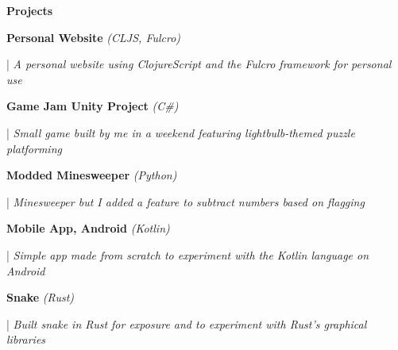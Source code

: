 \documentclass[letterpaper,11pt]{article}
\begin{document}
\textbf{\large Projects}


\begin{minipage}[t]{0.28\textwidth}
    \raggedright
    \textbf{ Personal Website }\textit{(CLJS, Fulcro)} \\
\end{minipage}
\hfill
\begin{minipage}[t]{0.70\textwidth}
    \raggedright
    |\textit{ A personal website using ClojureScript and the Fulcro framework for personal use} \\
\end{minipage}

\begin{minipage}[t]{0.28\textwidth}
    \raggedright
    \textbf{ Game Jam Unity Project }\textit{(C\#)} \\
\end{minipage}
\hfill
\begin{minipage}[t]{0.70\textwidth}
    \raggedright
    |\textit{ Small game built by me in a weekend featuring lightbulb-themed puzzle platforming} \\
\end{minipage}

\begin{minipage}[t]{0.28\textwidth}
    \raggedright
    \textbf{ Modded Minesweeper }\textit{(Python)} \\
\end{minipage}
\hfill
\begin{minipage}[t]{0.70\textwidth}
    \raggedright
    |\textit{ Minesweeper but I added a feature to subtract numbers based on flagging} \\
\end{minipage}

\begin{minipage}[t]{0.28\textwidth}
    \raggedright
    \textbf{ Mobile App, Android }\textit{(Kotlin)} \\
\end{minipage}
\hfill
\begin{minipage}[t]{0.70\textwidth}
    \raggedright
    |\textit{ Simple app made from scratch to experiment with the Kotlin language on Android} \\
\end{minipage}

\begin{minipage}[t]{0.28\textwidth}
    \raggedright
    \textbf{ Snake }\textit{(Rust)}\\
\end{minipage}
\hfill
\begin{minipage}[t]{0.70\textwidth}
    \raggedright
    |\textit{ Built snake in Rust for exposure and to experiment with Rust's graphical libraries} \\
\end{minipage}
\end{document}
